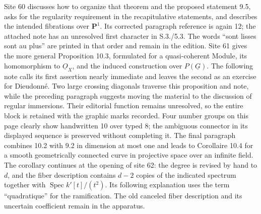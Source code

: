 \documentclass[10pt,a4paper]{article}
\begin{document}
Site 60 discusses how to organize that theorem and the proposed statement 9.5, asks for the regularity requirement in the recapitulative statements, and describes the intended fibrations over $\mathbf P^1$. Its corrected paragraph reference is again 12; the attached note has an unresolved first character in S.3./5.3. The words ``sont lisses sont au plus'' are printed in that order and remain in the edition. Site 61 gives the more general Proposition 10.3, formulated for a quasi-coherent Module, its homomorphism to $\underline O_X$, and the induced construction over $P(\underline G)$. The following note calls its first assertion nearly immediate and leaves the second as an exercise for Dieudonn\'e. Two large crossing diagonals traverse this proposition and note, while the preceding paragraph suggests moving the material to the discussion of regular immersions. Their editorial function remains unresolved, so the entire block is retained with the graphic marks recorded. Four number groups on this page clearly show handwritten 10 over typed 8; the ambiguous connector in its displayed sequence is preserved without completing it. The final paragraph combines 10.2 with 9.2 in dimension at most one and leads to Corollaire 10.4 for a smooth geometrically connected curve in projective space over an infinite field. The corollary continues at the opening of site 62: the degree is revised by hand to $d$, and the fiber description contains $d-2$ copies of the indicated spectrum together with $\operatorname{Spec}k'[t]/(t^2)$. Its following explanation uses the term ``quadratique'' for the ramification. The old canceled fiber description and its uncertain coefficient remain in the apparatus.
\par{}

\par{}
\end{document}

